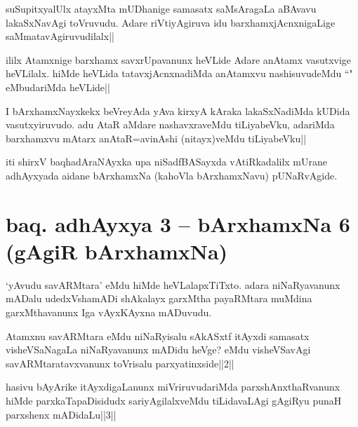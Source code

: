 
\begin{artha}
suSupitxyalUlx atayxMta mUDhanige samasatx saMsAragaLa aBAvavu lakaSxNavAgi toVruvudu. Adare riVtiyAgiruva idu barxhamxjAcnxnigaLige saMmatavAgiruvudilalx||
\end{artha}


\begin{artha}
ililx Atamxnige barxhamx savxrUpavanunx heVLide Adare anAtamx vasutxvige heVLilalx. hiMde heVLida tatavxjAcnxnadiMda anAtamxvu nashisuvudeMdu ``\stext " eMbudariMda heVLide||
\end{artha}

\begin{artha}
I bArxhamxNayxkekx beVreyAda yAva kirxyA kAraka lakaSxNadiMda kUDida vasutxyiruvudo. adu AtaR aMdare nashavxraveMdu tiLiyabeVku, adariMda barxhamxvu mAtarx anAtaR=avinAshi (nitayx)veMdu tiLiyabeVku|| 
\end{artha}

\begin{center}
iti shirxV baqhadAraNAyxka upa niSadfBASayxda vAtiRkadalilx mUrane adhAyxyada aidane bArxhamxNa (kahoVla bArxhamxNavu) pUNaRvAgide.
\end{center}

\section*{baq. adhAyxya 3 -- bArxhamxNa 6 (gAgiR bArxhamxNa)}%

\begin{artha}
`yAvudu savARMtara' eMdu hiMde heVLalapxTiTxto. adara niNaRyavanunx mADalu udedxVshamADi shAkalayx garxMtha payaRMtara muMdina garxMthavanunx Iga vAyxKAyxna mADuvudu.
\end{artha}

\begin{artha}
Atamxnu savARMtara eMdu niNaRyisalu sAkASxtf itAyxdi samasatx visheVSaNagaLa niNaRyavanunx mADidu heVge? eMdu visheVSavAgi savARMtaratavxvanunx toVrisalu parxyatinxside||2||

hasivu bAyArike itAyxdigaLanunx miVriruvudariMda parxshAnxthaRvanunx hiMde parxkaTapaDisidudx sariyAgilalxveMdu tiLidavaLAgi gAgiRyu punaH parxshenx mADidaLu||3||
\end{artha}


